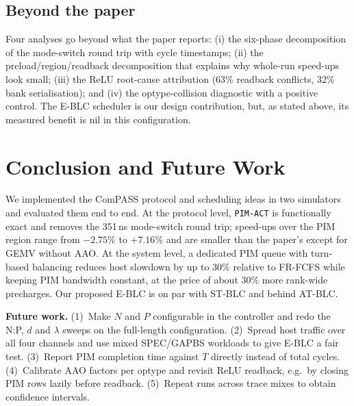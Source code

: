 \documentclass[conference]{IEEEtran}
\newcommand{\cmd}[1]{\texttt{\footnotesize #1}}
\newcommand{\pimact}{\cmd{PIM-ACT}\xspace}
\newcommand{\stblc}{ST-BLC}
\newcommand{\atblc}{AT-BLC}
\newcommand{\eblc}{E-BLC}
\begin{document}
\subsection{Beyond the paper}
Four analyses go beyond what the paper reports: (i) the six-phase decomposition of the mode-switch round trip with cycle timestamps; (ii) the preload/region/readback decomposition that explains why whole-run speed-ups look small; (iii) the ReLU root-cause attribution (63\% readback conflicts, 32\% bank serialisation); and (iv) the optype-collision diagnostic with a positive control. The \eblc{} scheduler is our design contribution, but, as stated above, its measured benefit is nil in this configuration.

\section{Conclusion and Future Work}\label{sec:conclusion}
We implemented the ComPASS protocol and scheduling ideas in two simulators and evaluated them end to end. At the protocol level, \pimact is functionally exact and removes the 351\,ns mode-switch round trip; speed-ups over the PIM region range from $-2.75\%$ to $+7.16\%$ and are smaller than the paper's except for GEMV without AAO. At the system level, a dedicated PIM queue with turn-based balancing reduces host slowdown by up to 30\% relative to FR-FCFS while keeping PIM bandwidth constant, at the price of about 30\% more rank-wide precharges. Our proposed \eblc{} is on par with \stblc{} and behind \atblc.

\textbf{Future work.} (1)~Make $N$ and $P$ configurable in the controller and redo the N:P, $d$ and $\lambda$ sweeps on the full-length configuration. (2)~Spread host traffic over all four channels and use mixed SPEC/GAPBS workloads to give \eblc{} a fair test. (3)~Report PIM completion time against $T$ directly instead of total cycles. (4)~Calibrate AAO factors per optype and revisit ReLU readback, e.g.\ by closing PIM rows lazily before readback. (5)~Repeat runs across trace mixes to obtain confidence intervals.

\end{document}
